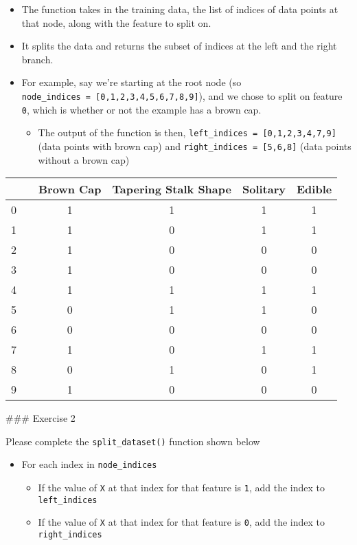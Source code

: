 \documentclass[11pt]{article}
\providecommand{\tightlist}{%
      \setlength{\itemsep}{0pt}\setlength{\parskip}{0pt}}
\begin{document}
\begin{itemize}
\tightlist
\item
  The function takes in the training data, the list of indices of data
  points at that node, along with the feature to split on.
\item
  It splits the data and returns the subset of indices at the left and
  the right branch.
\item
  For example, say we're starting at the root node (so
  \texttt{node\_indices\ =\ {[}0,1,2,3,4,5,6,7,8,9{]}}), and we chose to
  split on feature \texttt{0}, which is whether or not the example has a
  brown cap.

  \begin{itemize}
  \tightlist
  \item
    The output of the function is then,
    \texttt{left\_indices\ =\ {[}0,1,2,3,4,7,9{]}} (data points with
    brown cap) and \texttt{right\_indices\ =\ {[}5,6,8{]}} (data points
    without a brown cap)
  \end{itemize}
\end{itemize}

\begin{longtable}[]{@{}lccccc@{}}
\toprule
& & Brown Cap & Tapering Stalk Shape & Solitary & Edible\tabularnewline
\midrule
\endhead
0 & & 1 & 1 & 1 & 1\tabularnewline
1 & & 1 & 0 & 1 & 1\tabularnewline
2 & & 1 & 0 & 0 & 0\tabularnewline
3 & & 1 & 0 & 0 & 0\tabularnewline
4 & & 1 & 1 & 1 & 1\tabularnewline
5 & & 0 & 1 & 1 & 0\tabularnewline
6 & & 0 & 0 & 0 & 0\tabularnewline
7 & & 1 & 0 & 1 & 1\tabularnewline
8 & & 0 & 1 & 0 & 1\tabularnewline
9 & & 1 & 0 & 0 & 0\tabularnewline
\bottomrule
\end{longtable}

\#\#\# Exercise 2

Please complete the \texttt{split\_dataset()} function shown below

\begin{itemize}
\tightlist
\item
  For each index in \texttt{node\_indices}

  \begin{itemize}
  \tightlist
  \item
    If the value of \texttt{X} at that index for that feature is
    \texttt{1}, add the index to \texttt{left\_indices}
  \item
    If the value of \texttt{X} at that index for that feature is
    \texttt{0}, add the index to \texttt{right\_indices}
  \end{itemize}
\end{itemize}
\end{document}
